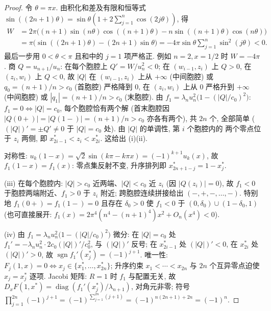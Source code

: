 \documentclass[UTF8]{ctexart}
\begin{document}
\begin{proof}
令 $\theta=\pi x$. 由积化和差及有限和恒等式
$\sin((2n+1)\theta)=\sin\theta(1+2\sum_{j=1}^n\cos(2j\theta))$, 得
\begin{equation}\label{eq:Wconstant}
\begin{aligned}
W&=2\pi\bigl((n+1)\sin(n\theta)\cos((n+1)\theta)
-n\sin((n+1)\theta)\cos(n\theta)\bigr)\\
&=\pi\bigl(\sin((2n+1)\theta)-(2n+1)\sin\theta\bigr)
=-4\pi\sin\theta\sum_{j=1}^n\sin^2(j\theta)<0.
\end{aligned}
\end{equation}
最后一步用 $0<\theta<\pi$ 且和中的 $j=1$ 项严格正. 例如 $n=2,x=1/2$ 时
$W=-4\pi$. 商 $Q=u_{n+1}/u_n$: 在每个胞腔上 $Q'=W/u_n^2<0$;
在 $(w_{i-1},z_i)$ 上 $Q>0$, 在 $(z_i,w_i)$ 上 $Q<0$,
故 $|Q|$ 在 $(w_{i-1},z_i)$ 上从 $+\infty$ (中间胞腔) 或 $q_0=(n+1)/n>c_0$
(首胞腔) 严格降到 $0$, 在 $(z_i,w_i)$ 上从 $0$ 严格升到 $+\infty$ (中间胞腔)
或 $|q_1|=(n+1)/n>c_0$ (末胞腔). 由 $f_1=\lambda_nu_n^2\bigl(1-(|Q|/c_0)^2\bigr)$:
$f_1=0\iff|Q|=c_0$, 每个胞腔恰有两个解 (首末胞腔因
$|Q(0+)|=|Q(1-)|=(n+1)/n>c_0$ 亦各有两个), 共 $2n$ 个, 全部简单
($(|Q|)'=\pm Q'\neq0$ 于 $|Q|=c_0$ 处). 由 $|Q|$ 的单调性, 第 $i$ 个胞腔内的
两个零点位于 $z_i$ 两侧, 即 $x_{2i-1}^*<z_i<x_{2i}^*$. 这给出 (i)(ii).

对称性: $u_k(1-x)=\sqrt2\sin(k\pi-k\pi x)=(-1)^{k+1}u_k(x)$,
故 $f_1(1-x)=f_1(x)$: 零点集反射不变,
升序排列即 $x_{2n+1-j}^*=1-x_j^*$.

(iii) 在每个胞腔内: $|Q|>c_0$ 近两端、$|Q|<c_0$ 近 $z_i$ (因 $|Q(z_i)|=0$),
故 $f_1<0$ 于胞腔两端附近、$f_1>0$ 于 $z_i$ 附近; 跨胞腔连续拼接给出
$(-,+,-,\dots,-)$. 特别地 $f_1(0+)=f_1(1-)=0$ 且存在 $\delta_0>0$ 使
$f_1<0$ 于 $(0,\delta_0)\cup(1-\delta_0,1)$ (也可直接展开:
$f_1(x)=2\pi^4(n^4-(n+1)^4)x^2+O_n(x^4)<0$).

(iv) 由 $f_1=\lambda_nu_n^2\bigl(1-(|Q|/c_0)^2\bigr)$ 微分: 在 $|Q|=c_0$ 处
$f_1'=-\lambda_nu_n^2\cdot2c_0(|Q|)'/c_0^2$, 与 $(|Q|)'$ 反号; 在
$x_{2i-1}^*$ 处 $(|Q|)'<0$, 在 $x_{2i}^*$ 处 $(|Q|)'>0$, 故
$\operatorname{sgn}f_1'(x_j^*)=(-1)^{j+1}$.
唯一性: $F_j(1,x)=0\iff x_j\in\{x_1^*,\dots,x_{2n}^*\}$; 升序约束
$x_1<\cdots<x_{2n}$ 与 $2n$ 个互异零点迫使 $x_j=x_j^*$ 逐项. Jacobi 矩阵:
$R=1$ 时 $f_1$ 与配置无关, 故 $D_xF(1,x^*)=\operatorname{diag}(f_1'(x_j^*)/\lambda_{n+1})$,
对角元非零; 符号
$\prod_{j=1}^{2n}(-1)^{j+1}=(-1)^{\sum_{j=1}^{2n}(j+1)}=(-1)^{n(2n+1)+2n}=(-1)^n$.
\end{proof}
\end{document}
